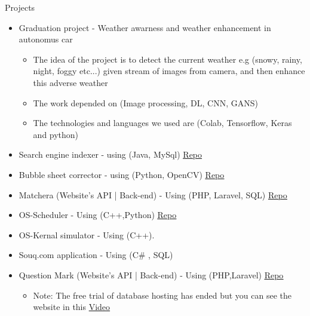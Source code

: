 \documentclass{resume}
\begin{document}
\begin{rSection}{Projects}
    \begin{itemize}
        \item Graduation project - Weather awarness and weather enhancement in autonomus car
        \begin{itemize}
            \item The idea of the project is to detect the current weather e.g (snowy, rainy, night, foggy etc...) given stream of images from camera, and then enhance this adverse weather
            \item The work depended on (Image processing, DL, CNN, GANS)
            \item The technologies and languages we used are (Colab, Tensorflow, Keras and python)
        \end{itemize}
        \item Search engine indexer - using (Java, MySql) \hfill{\underline{\href{https://github.com/sofyanmahmoud0000/Jindexer}{Repo}}}
        \item Bubble sheet corrector  - using (Python, OpenCV) \hfill{\underline{\href{https://github.com/sofyanmahmoud0000/BSCorrector}{Repo}}}
        \item Matchera (Website's API | Back-end) - Using (PHP, Laravel, SQL) \hfill{\underline{\href{https://github.com/sofyanmahmoud0000/Matchera}{Repo}}}
        \item OS-Scheduler - Using (C++,Python) \hfill{\underline{\href{https://github.com/sofyanmahmoud0000/OS-Scheduler}{Repo}}}
        \item OS-Kernal simulator - Using (C++).
        \item Souq.com application - Using (C\# , SQL)
        \item Question Mark (Website's API | Back-end) - Using (PHP,Laravel)  \hfill{\underline{\href{https://github.com/sofyanmahmoud0000/questionmark}{Repo}}}
        \begin{itemize}
            \item Note: The free trial of database hosting has ended but you can see the  \\ website in this \href{https://www.linkedin.com/posts/sofyanmahmoud0000_backabrend-activity-6682367407136268289-77Jk?utm_source=linkedin_share&utm_medium=member_desktop_web}{Video}
        \end{itemize}
    \end{itemize}
\end{rSection}
\end{document}
